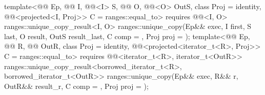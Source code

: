 \begin{itemdecl}
template<@@ Ep, @@ I, @@<I> S,
         @@ O, @@<O> OutS, class Proj = identity,
         @@<projected<I, Proj>> C = ranges::equal_to>
  requires @@<I, O>
  ranges::unique_copy_result<I, O>
    ranges::unique_copy(Ep&& exec, I first, S last, O result, OutS result_last,
                        C comp = {}, Proj proj = {});
template<@@ Ep, @@ R, @@ OutR,
         class Proj = identity,
         @@<projected<iterator_t<R>, Proj>> C = ranges::equal_to>
  requires @@<iterator_t<R>, iterator_t<OutR>>
  ranges::unique_copy_result<borrowed_iterator_t<R>, borrowed_iterator_t<OutR>>
    ranges::unique_copy(Ep&& exec, R&& r, OutR&& result_r, C comp = {}, Proj proj = {});
\end{itemdecl}

